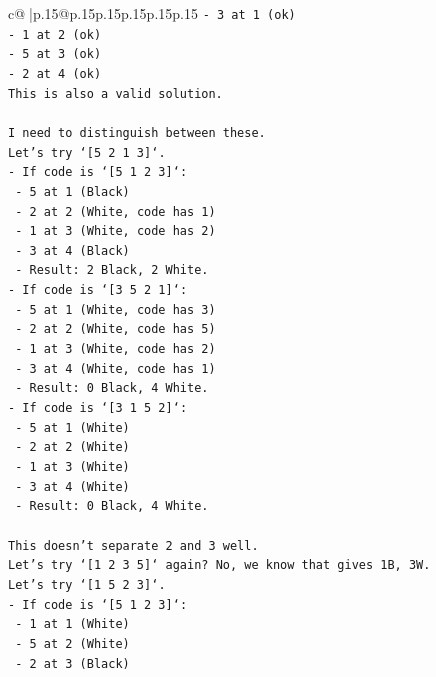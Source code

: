 \documentclass{article}
\begin{document}
{\begin{supertabular}{c@{$\;$}|p{.15\linewidth}@{}p{.15\linewidth}p{.15\linewidth}p{.15\linewidth}p{.15\linewidth}p{.15\linewidth}}
{{{\texttt{{-} 3 at 1 (ok)} \\
\texttt{{-} 1 at 2 (ok)} \\
\texttt{{-} 5 at 3 (ok)} \\
\texttt{{-} 2 at 4 (ok)} \\
\texttt{This is also a valid solution.} \\
\\ 
\texttt{I need to distinguish between these.} \\
\texttt{Let's try `{[}5 2 1 3{]}`.} \\
\texttt{{-} If code is `{[}5 1 2 3{]}`:} \\
\texttt{  {-} 5 at 1 (Black)} \\
\texttt{  {-} 2 at 2 (White, code has 1)} \\
\texttt{  {-} 1 at 3 (White, code has 2)} \\
\texttt{  {-} 3 at 4 (Black)} \\
\texttt{  {-} Result: 2 Black, 2 White.} \\
\texttt{{-} If code is `{[}3 5 2 1{]}`:} \\
\texttt{  {-} 5 at 1 (White, code has 3)} \\
\texttt{  {-} 2 at 2 (White, code has 5)} \\
\texttt{  {-} 1 at 3 (White, code has 2)} \\
\texttt{  {-} 3 at 4 (White, code has 1)} \\
\texttt{  {-} Result: 0 Black, 4 White.} \\
\texttt{{-} If code is `{[}3 1 5 2{]}`:} \\
\texttt{  {-} 5 at 1 (White)} \\
\texttt{  {-} 2 at 2 (White)} \\
\texttt{  {-} 1 at 3 (White)} \\
\texttt{  {-} 3 at 4 (White)} \\
\texttt{  {-} Result: 0 Black, 4 White.} \\
\\ 
\texttt{This doesn't separate 2 and 3 well.} \\
\texttt{Let's try `{[}1 2 3 5{]}` again? No, we know that gives 1B, 3W.} \\
\texttt{Let's try `{[}1 5 2 3{]}`.} \\
\texttt{{-} If code is `{[}5 1 2 3{]}`:} \\
\texttt{  {-} 1 at 1 (White)} \\
\texttt{  {-} 5 at 2 (White)} \\
\texttt{  {-} 2 at 3 (Black)} \\
}}}
\end{supertabular}}
\end{document}
